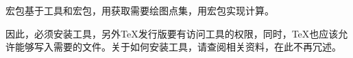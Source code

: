 \documentclass[../main.tex]{subfiles}
\begin{document}
宏包基于工具和宏包，用获取需要绘图点集，用宏包实现计算。

因此，必须安装工具，另外\TeX{}发行版要有访问工具的权限，同时，\TeX{}也应该允许能够写入需要的文件。关于如何安装工具，请查阅相关资料，在此不再冗述。
\end{document}
